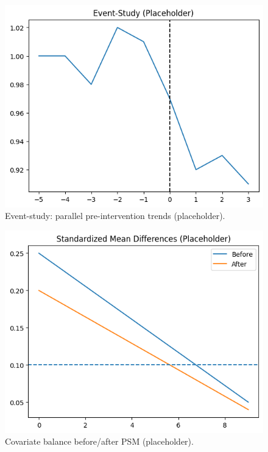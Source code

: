 \documentclass[10pt]{article}
\begin{document}
\begin{multicols}{2}
\begin{figure}[H]
\centering
\includegraphics[width=\linewidth]{../figures/fig1_event_study.png}
\caption{Event-study: parallel pre-intervention trends (placeholder).}
\label{fig:eventstudy}
\end{figure}

\begin{figure}[H]
\centering
\includegraphics[width=\linewidth]{../figures/fig2_smd_balance.png}
\caption{Covariate balance before/after PSM (placeholder).}
\label{fig:smd}
\end{figure}


\end{multicols}
\end{document}
